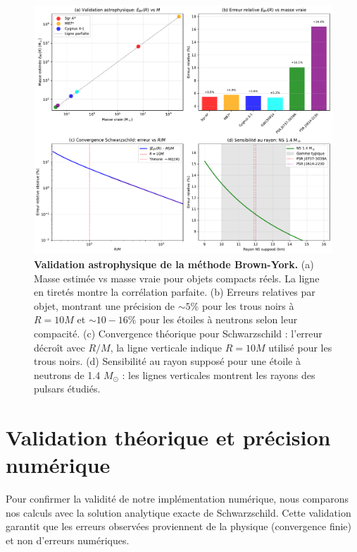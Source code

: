 \documentclass[11pt]{article}
\begin{document}
\begin{figure}[!htb]
\centering
\includegraphics[width=\linewidth]{fig_astrophysical_validation.pdf}
\caption{\textbf{Validation astrophysique de la méthode Brown-York.} (a) Masse estimée vs masse vraie pour objets compacts réels. La ligne en tiretés montre la corrélation parfaite. (b) Erreurs relatives par objet, montrant une précision de $\sim 5\%$ pour les trous noirs à $R=10M$ et $\sim 10-16\%$ pour les étoiles à neutrons selon leur compacité. (c) Convergence théorique pour Schwarzschild : l'erreur décroît avec $R/M$, la ligne verticale indique $R=10M$ utilisé pour les trous noirs. (d) Sensibilité au rayon supposé pour une étoile à neutrons de 1.4 $M_\odot$ : les lignes verticales montrent les rayons des pulsars étudiés.}
\end{figure}

\section{Validation théorique et précision numérique}

Pour confirmer la validité de notre implémentation numérique, nous comparons nos calculs avec la solution analytique exacte de Schwarzschild. Cette validation garantit que les erreurs observées proviennent de la physique (convergence finie) et non d'erreurs numériques.
\end{document}
